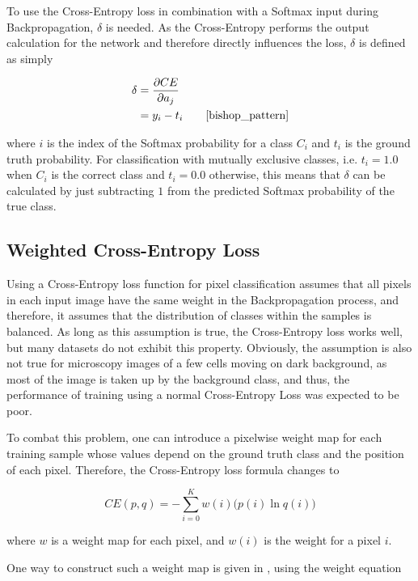 \noindent To use the Cross-Entropy loss in combination with a Softmax input during Backpropagation, $\delta$ is needed. As the Cross-Entropy performs the output calculation for the network and therefore directly influences the loss, $\delta$ is defined as simply

\begin {align} \delta &= \frac{\partial CE}{\partial a_j}\\  
			    &= y_i - t_i \hspace{2em}\cite[\text{ p. 209}]{bishop_pattern}
\end {align}

\noindent where $i$ is the index of the Softmax probability for a class $C_i$ and $t_i$ is the ground truth probability. For classification with mutually exclusive classes, i.e. $t_i = 1.0$ when $C_i$ is the correct class and $t_i = 0.0$ otherwise, this means that $\delta$ can be calculated by just subtracting $1$ from the predicted Softmax probability of the true class.


		\subsection{Weighted Cross-Entropy Loss}

Using a Cross-Entropy loss function for pixel classification assumes that all pixels in each input image have the same weight in the Backpropagation process, and therefore, it assumes that the distribution of classes within the samples is balanced. As long as this assumption is true, the Cross-Entropy loss works well, but many datasets do not exhibit this property. Obviously, the assumption is also not true for microscopy images of a few cells moving on dark background, as most of the image is taken up by the background class, and thus, the performance of training using a normal Cross-Entropy Loss was expected to be poor.

To combat this problem, one can introduce a pixelwise weight map for each training sample whose values depend on the ground truth class and the position of each pixel. Therefore, the Cross-Entropy loss formula changes to

\[ CE(p, q) = -\sum \limits_{i = 0}^{K} w(i) \bigg ( p(i) \ln q(i) \bigg ) \]

\noindent where $w$ is a weight map for each pixel, and $w(i)$ is the weight for a pixel $i$.

One way to construct such a weight map is given in \cite{unet}, using the weight equation

